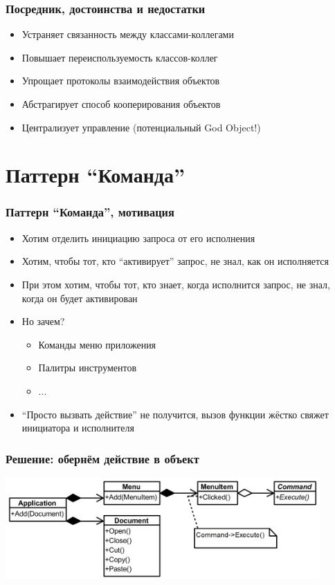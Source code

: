 \documentclass[xetex,mathserif,serif]{beamer}
\begin{document}
    \begin{frame}
        \frametitle{Посредник, достоинства и недостатки}
        \begin{itemize}
            \item Устраняет связанность между классами-коллегами
            \item Повышает переиспользуемость классов-коллег
            \item Упрощает протоколы взаимодействия объектов
            \item Абстрагирует способ кооперирования объектов
            \item Централизует управление (потенциальный God Object!)
        \end{itemize}
    \end{frame}

    \section{Паттерн ``Команда''}

    \begin{frame}
        \frametitle{Паттерн ``Команда'', мотивация}
        \begin{itemize}
            \item Хотим отделить инициацию запроса от его исполнения
            \item Хотим, чтобы тот, кто ``активирует'' запрос, не знал, как он исполняется
            \item При этом хотим, чтобы тот, кто знает, когда исполнится запрос, не знал, когда он будет активирован
            \item Но зачем?
            \begin{itemize}
                \item Команды меню приложения
                \item Палитры инструментов
                \item ...
            \end{itemize}
            \item ``Просто вызвать действие'' не получится, вызов функции жёстко свяжет инициатора и исполнителя
        \end{itemize}
    \end{frame}

    \begin{frame}
        \frametitle{Решение: обернём действие в объект}
        \begin{center}
            \includegraphics[width=0.9\textwidth]{commandExample.png}
        \end{center}
    \end{frame}
\end{document}
